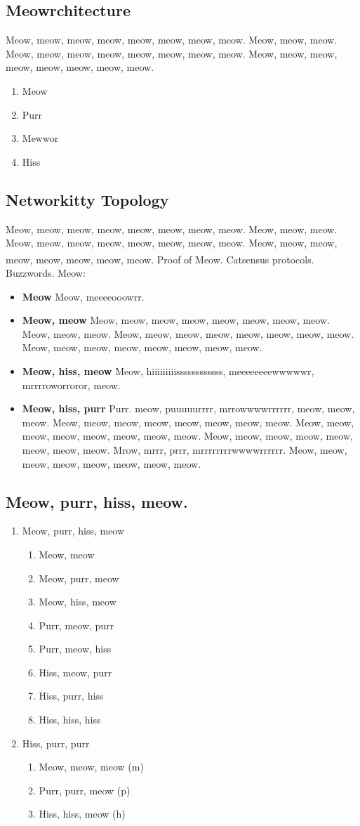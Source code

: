 \documentclass[9pt,oneside]{amsart}
\newcommand*\lipsumeow{Meow, meow, meow, meow, meow, meow, meow, meow.  Meow, meow, meow. Meow, meow, meow, meow, meow, meow, meow, meow. Meow, meow, meow, meow, meow, meow, meow, meow. }
\newcommand*\lipsumeowpurr{Purr. meow, puuuuurrrr, mrrowwwwrrrrrr, meow, meow, meow. Meow, meow, meow, meow, meow, meow, meow, meow. Meow, meow, meow, meow, meow, meow, meow, meow. Meow, meow, meow, meow, meow, meow, meow, meow. Mrow, mrrr, prrr, mrrrrrrrrwwwwrrrrrr. Meow, meow, meow, meow, meow, meow, meow, meow.}
\newcommand*\lipsumhiss{Meow, hiiiiiiiiissssssssssss, meeeeeeeewwwwwr, mrrrroworroror, meow.}
\begin{document}
\begin{multicols}{2}
\section{Meowrchitecture}\label{sec:architecture}
 
 \lipsumeow{}
 
\begin{enumerate}
  \item Meow 
  \item Purr
  \item Mewwor
  \item Hiss
\end{enumerate}

\subsection{Networkitty Topology}\label{subsec:network_topology}

 \lipsumeow{} Proof of Meow.\textsuperscript{\textregistered} Catsensus protocols. Buzzwords. Meow:
 
\begin{itemize}
 \item \textbf{Meow}  Meow, meeeeooowrr.
 \item  \textbf{Meow, meow} \lipsumeow{}
 \item  \textbf{Meow, hiss, meow} \lipsumhiss{}
 \item  \textbf{Meow, hiss, purr} \lipsumeowpurr{}
\end{itemize}
 
\subsection{Meow, purr, hiss, meow.}\label{subsec:decentral_security_scalable}

\begin{enumerate}
   \item Meow, purr, hiss, meow
       \begin{enumerate}
          \item Meow, meow
          \item Meow, purr, meow
          \item Meow, hiss, meow
          \item Purr, meow, purr
          \item Purr, meow, hiss
          \item Hiss, meow, purr
          \item Hiss, purr, hiss
          \item Hiss, hiss, hiss
       \end{enumerate}  
   \item Hiss, purr, purr
       \begin{enumerate}
          \item Meow, meow, meow (m)
          \item Purr, purr, meow (p)
          \item Hiss, hiss, meow (h)
       \end{enumerate}
\end{enumerate}
 

\end{multicols}
\end{document}
